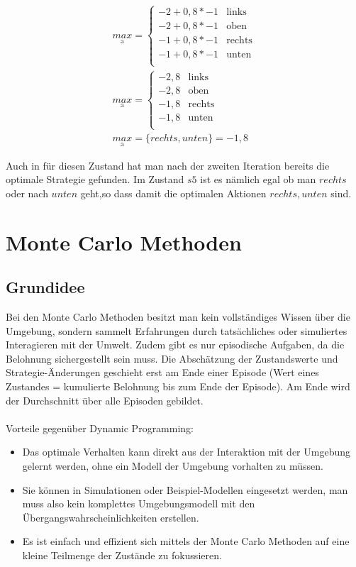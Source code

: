\documentclass[10pt]{scrartcl}
\begin{document}
\begin{align}
	\underset{\text{a}}{max} = \begin{cases} 
		-2 + 0,8 * -1 & \text{links} \\ 
		-2 + 0,8 * -1 & \text{oben} \\
		-1 + 0,8 * -1 & \text{rechts} \\
		-1 + 0,8 * -1 & \text{unten} \\ 
 	\end{cases}\\
 	\underset{\text{a}}{max} = \begin{cases} 
		-2,8 & \text{links} \\ 
		-2,8 & \text{oben} \\
		-1,8 & \text{rechts} \\
		-1,8 & \text{unten} \\ 
 	\end{cases}\\
 	\underset{\text{a}}{max} = \{ rechts, unten \} = -1,8
\end{align}

Auch in für diesen Zustand hat man nach der zweiten Iteration bereits die optimale Strategie gefunden. 
Im Zustand $s5$ ist es nämlich egal ob man $rechts$ oder nach $unten$ geht,so dass damit die optimalen Aktionen ${rechts, unten}$ sind.

\section{Monte Carlo Methoden}
\label{sec:monteCarloMethoden}

\subsection{Grundidee}
Bei den Monte Carlo Methoden besitzt man kein vollständiges Wissen über die Umgebung, sondern sammelt Erfahrungen durch tatsächliches oder simuliertes Interagieren mit der Umwelt. Zudem gibt es nur episodische Aufgaben, da die Belohnung sichergestellt sein muss. Die Abschätzung der Zustandswerte und Strategie-Änderungen geschieht erst am Ende einer Episode (Wert eines Zustandes = kumulierte Belohnung bis zum Ende der Episode). Am Ende wird der Durchschnitt über alle Episoden gebildet.\\
\\
Vorteile gegenüber Dynamic Programming:
\begin{itemize}
\item{Das optimale Verhalten kann direkt aus der Interaktion mit der Umgebung gelernt werden, ohne ein Modell der Umgebung vorhalten zu müssen.}
\item{Sie können in Simulationen oder Beispiel-Modellen eingesetzt werden, man muss also kein komplettes Umgebungsmodell mit den Übergangswahrscheinlichkeiten erstellen.}
\item{Es ist einfach und effizient sich mittels der Monte Carlo Methoden auf eine kleine Teilmenge der Zustände zu fokussieren.}
\end{itemize}
\end{document}
